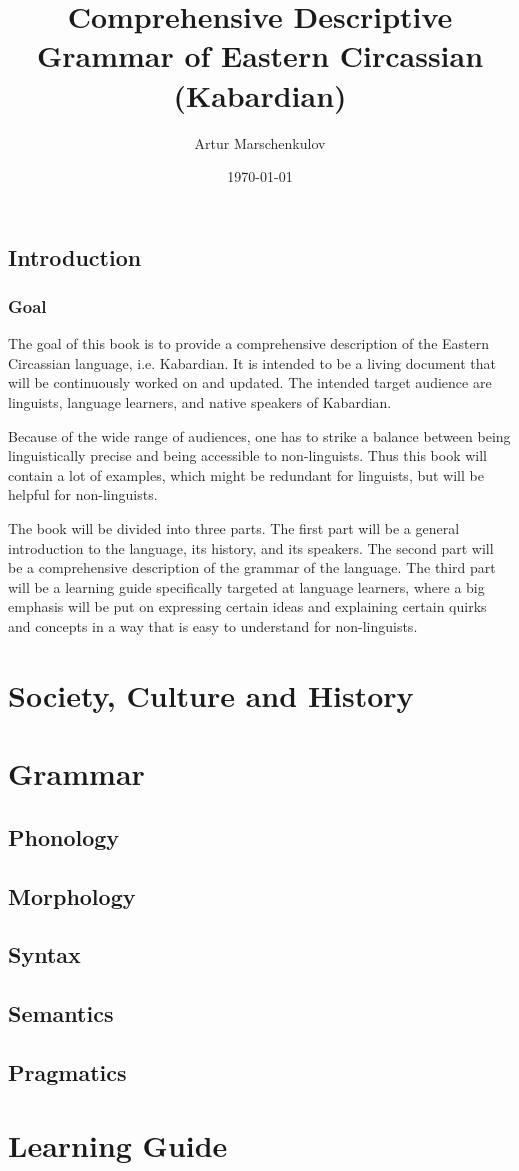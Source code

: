 \documentclass[a4paper,11pt]{book}
\begin{document}
\title{Comprehensive Descriptive Grammar of Eastern Circassian (Kabardian)}
\author{Artur Marschenkulov}
\date{\today}

\maketitle

\tableofcontents


\chapter{Introduction}
\section{Goal}
The goal of this book is to provide a comprehensive description of the Eastern Circassian language, i.e. Kabardian. It is intended to be a living document that will be continuously worked on and updated. The intended target audience are linguists, language learners, and native speakers of Kabardian.

Because of the wide range of audiences, one has to strike a balance between being linguistically precise and being accessible to non-linguists. Thus this book will contain a lot of examples, which might be redundant for linguists, but will be helpful for non-linguists.

The book will be divided into three parts. The first part will be a general introduction to the language, its history, and its speakers. The second part will be a comprehensive description of the grammar of the language. The third part will be a learning guide specifically targeted at language learners, where a big emphasis will be put on expressing certain ideas and explaining certain quirks and concepts in a way that is easy to understand for non-linguists.

\part{Society, Culture and History}
\part{Grammar}
\chapter{Phonology}
\chapter{Morphology}
\chapter{Syntax}
\chapter{Semantics}
\chapter{Pragmatics}
\part{Learning Guide}
\end{document}
